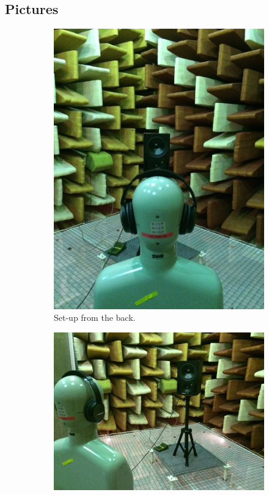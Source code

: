 \subsection{Pictures}
\begin{figure}[H]
	\centering
	\begin{subfigure}[b]{0.5\textwidth}
		\centering
		\includegraphics[width=\textwidth]{../Journal/Experiments/TestofConsumerHeadphones/Pictures/OtherBrandsSetupBack.jpg}
		\caption{Set-up from the back.}
	\end{subfigure}\qquad
	\begin{subfigure}[b]{0.4\textwidth}
		\includegraphics[width=\textwidth]{../Journal/Experiments/TestofConsumerHeadphones/Pictures/OtherBrandsSetupAngle.jpg}

\end{subfigure}
\end{figure}
